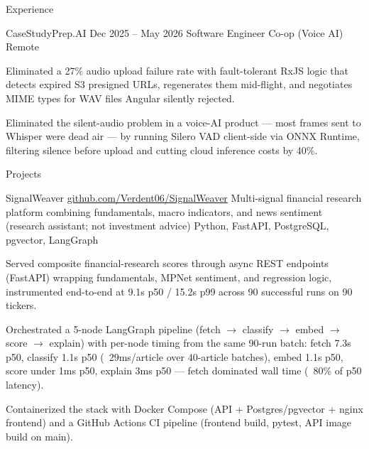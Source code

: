 \documentclass[
	11pt
]{../../../template}
\begin{document}
\begin{rSection}{E}{xperience}
		\begin{rSectionEntry}
			{CaseStudyPrep.AI}
			{Dec 2025 -- May 2026}
			{Software Engineer Co-op (Voice AI)}
			{}
			{Remote}

			\item Eliminated a 27\% audio upload failure rate with fault-tolerant RxJS logic that detects expired S3 presigned URLs, regenerates them mid-flight, and negotiates MIME types for WAV files Angular silently rejected.
			\item Eliminated the silent-audio problem in a voice-AI product --- most frames sent to Whisper were dead air --- by running Silero VAD client-side via ONNX Runtime, filtering silence before upload and cutting cloud inference costs by 40\%.
		\end{rSectionEntry}
	\end{rSection}

	\begin{rSection}{P}{rojects}
		\begin{rSectionEntry}
			{SignalWeaver}
			{\href{https://github.com/Verdent06/SignalWeaver}{github.com/Verdent06/SignalWeaver}}
			{Multi-signal financial research platform combining fundamentals, macro indicators, and news sentiment (research assistant; not investment advice)}
			{Python, FastAPI, PostgreSQL, pgvector, LangGraph}
			{}

			\item Served composite financial-research scores through async REST endpoints (FastAPI) wrapping fundamentals, MPNet sentiment, and regression logic, instrumented end-to-end at 9.1s p50 / 15.2s p99 across 90 successful runs on 90 tickers.
			\item Orchestrated a 5-node LangGraph pipeline (fetch $\rightarrow$ classify $\rightarrow$ embed $\rightarrow$ score $\rightarrow$ explain) with per-node timing from the same 90-run batch: fetch 7.3s p50, classify 1.1s p50 (~29ms/article over 40-article batches), embed 1.1s p50, score under 1ms p50, explain 3ms p50 --- fetch dominated wall time (~80\% of p50 latency).
			\item Containerized the stack with Docker Compose (API + Postgres/pgvector + nginx frontend) and a GitHub Actions CI pipeline (frontend build, pytest, API image build on main).
		\end{rSectionEntry}
	\end{rSection}
\end{document}
